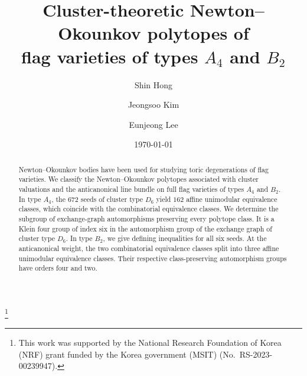 \documentclass[10pt]{amsart}
\numberwithin{equation}{section}
\theoremstyle{plain}
\theoremstyle{definition}
\theoremstyle{remark}
\begin{document}
\author{Shin Hong}
\address[Shin Hong]{School of Computer Science, 
	Chungbuk National University,
	Cheongju 28644, Republic of Korea}


\author{Jeongsoo Kim}
\address[Jeongsoo Kim]{Department of Mathematics,
	Chungbuk National University,
	Cheongju 28644, Republic of Korea}


\author{Eunjeong Lee}
\address[Eunjeong Lee]{Department of Mathematics,
	Chungbuk National University,
	Cheongju 28644, Republic of Korea}


\thanks{This work was supported by the National Research Foundation of Korea (NRF) grant funded by the Korea government (MSIT) (No.\ RS-2023-00239947).}

\title[Cluster-theoretic Newton--Okounkov polytopes]
{Cluster-theoretic Newton--Okounkov polytopes
	of \\ flag varieties of types $A_4$ and $B_2$}

\begin{abstract}
Newton--Okounkov bodies have been used for studying toric degenerations of flag varieties.	
We classify the Newton--Okounkov polytopes associated with
cluster valuations and the anticanonical line bundle on
full flag varieties of types $A_4$ and $B_2$.
In type $A_4$, the $672$ seeds of cluster type $D_6$ yield
$162$ affine unimodular equivalence classes, which coincide
with the combinatorial equivalence classes. 
We determine the subgroup of exchange-graph automorphisms
preserving every polytope class.
It is a Klein four group of index six in the automorphism
group of the exchange graph of cluster type $D_6$.
In type $B_2$, we give defining inequalities for all six seeds. 
At the anticanonical weight, the two combinatorial equivalence
classes split into three affine unimodular equivalence classes.
Their respective class-preserving automorphism groups have
orders four and two.
\end{abstract}

\date{\today}




\maketitle
\end{document}

